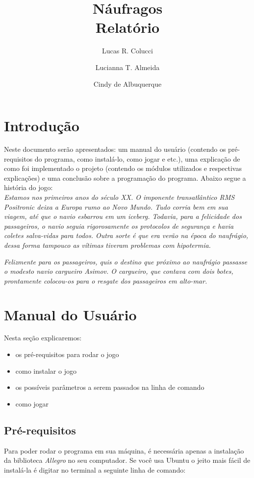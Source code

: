 \documentclass[12pt,a4paper]{article}
\title{Náufragos\\Relatório}
\author{Lucas R. Colucci \and Lucianna T. Almeida \and Cindy de Albuquerque}
\begin{document}
\maketitle

\newpage

\tableofcontents
\newpage

\section{Introdução}
Neste documento serão apresentados: um manual do usuário (contendo os pré-requisitos do programa, como instalá-lo,
 como jogar e etc.), uma explicação de como foi implementado o projeto
 (contendo os módulos utilizados e respectivas explicações) e uma conclusão sobre a programação do programa.
Abaixo segue a história do jogo:\\

\emph{Estamos nos primeiros anos do século XX. O imponente transatlântico RMS Positronic deixa a Europa rumo ao Novo Mundo. Tudo corria bem em sua viagem, até que o navio esbarrou em um iceberg. Todavia, para a felicidade dos passageiros, o navio seguia rigorosamente os protocolos de segurança e havia coletes salva-vidas para todos. Outra sorte é que era verão na época do naufrágio, dessa forma tampouco as vítimas tiveram problemas com hipotermia.}

\emph{Felizmente para os passageiros, quis o destino que próximo ao naufrágio passasse o modesto navio cargueiro Asimov. O cargueiro, que contava com dois botes, prontamente colocou-os para o resgate dos passageiros em alto-mar. }
 
\section{Manual do Usuário}

Nesta seção explicaremos:
\begin{itemize}
\item os pré-requisitos para rodar o jogo
\item como instalar o jogo
\item os possíveis parâmetros a serem passados na linha de comando
\item como jogar
\end{itemize}
 

\subsection{Pré-requisitos}
Para poder rodar o programa em sua máquina, é necessária apenas a instalação da biblioteca \emph{Allegro} no seu computador.
Se você usa Ubuntu o jeito mais fácil de instalá-la é digitar no terminal a seguinte linha de comando:
\end{document}
